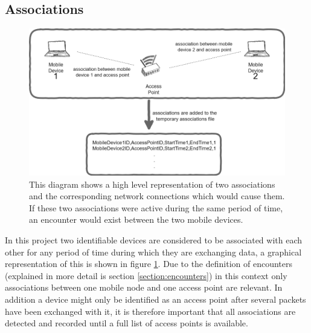 \subsection{Associations} 

\begin{figure}[h]
    \centerline{\includegraphics[width=1.2\textwidth]{hardware_to_assoc.png}}
    \caption{This diagram shows a high level representation of two associations and the corresponding network connections which would cause them. If these two associations were active during the same period of time, an encounter would exist between the two mobile devices.}
    \label{fig:high_level_dia}
\end{figure}
In this project two identifiable devices are considered to be associated with each other for any period of time during which they are exchanging data, a graphical representation of this is shown in figure \ref{fig:high_level_dia}. Due to the definition of encounters (explained in more detail is section \ref{section:encounters}) in this context only associations between one mobile node and one access point are relevant. In addition a device might only be identified as an access point after several packets have been exchanged with it, it is therefore important that all associations are detected and recorded until a full list of access points is available.
